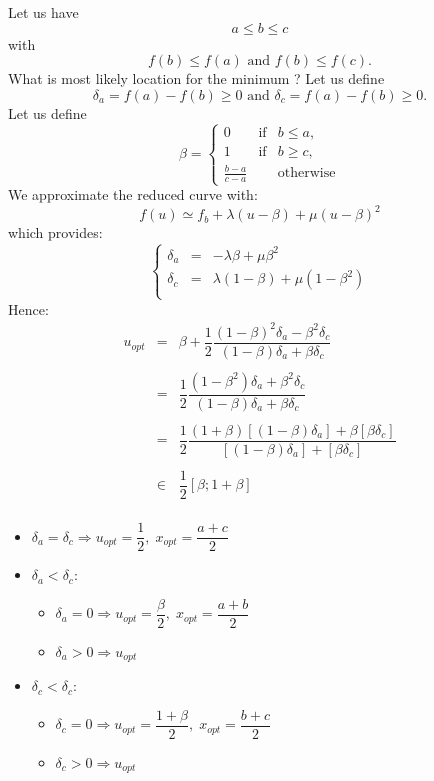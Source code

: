 \documentclass[aps,12pt]{revtex4}
\begin{document}

Let us have 
$$a \leq b \leq c$$ 
with 
$$f(b)\leq f(a) \text{ and } f(b)\leq f(c).$$
What is most likely location for the minimum ?
Let us define $$\delta_a = f(a)-f(b) \geq 0 \text{ and } \delta_c = f(a)-f(b)  \geq 0.$$ 
Let us define 
$$
	\beta = 
	\left\lbrace
	\begin{array}{rcl}
	0 & \text{if} & b\leq a,\\
	1 & \text{if} & b\geq c,\\
	\frac{b-a}{c-a} & & \text{otherwise}
	\end{array}
	\right.
$$
We approximate the reduced curve with:
$$
	f(u) \simeq f_b + \lambda (u-\beta)  + \mu (u-\beta)^2
$$
which provides:
$$
\left\lbrace
\begin{array}{rcl}
	\delta_a & = & -\lambda \beta + \mu \beta^2 \\
	\delta_c & = & \lambda(1-\beta) + \mu (1-\beta^2)\\
\end{array}
\right.
$$
Hence:
$$
\begin{array}{rcl}
	u_{opt} & = & \beta + \dfrac{1}{2} \dfrac{(1-\beta)^2 \delta_a - \beta^2 \delta_c }{(1-\beta)\delta_a + \beta \delta_c}\\
	\\
	 & = & \dfrac{1}{2} \dfrac{(1-\beta^2)\delta_a + \beta^2 \delta_c }{(1-\beta)\delta_a + \beta \delta_c}\\
	 \\
	 & = & \dfrac{1}{2} \dfrac{ (1+\beta)\left[(1-\beta)\delta_a\right] + \beta \left[\beta \delta_c\right] }{ \left[(1-\beta)\delta_a\right] + \left[\beta \delta_c\right] }\\
	 \\
	 & \in & \dfrac{1}{2} \left[ \beta; 1+\beta\right]\\ 
\end{array}
$$

\begin{itemize}
\item $\delta_a=\delta_c \Rightarrow u_{opt}=\dfrac{1}{2}, \; x_{opt}= \dfrac{a+c}{2}$
\item $\delta_a<\delta_c$:
	\begin{itemize}
	\item $\delta_a=0 \Rightarrow u_{opt} = \dfrac{\beta}{2}, \; x_{opt} = \dfrac{a+b}{2}$
	\item $\delta_a>0 \Rightarrow u_{opt}$
	\end{itemize}
\item $\delta_c<\delta_c$:
	\begin{itemize}
	\item $\delta_c=0 \Rightarrow u_{opt} = \dfrac{1+\beta}{2}, \;x_{opt} = \dfrac{b+c}{2}$
	\item $\delta_c>0 \Rightarrow u_{opt}$
	\end{itemize}
\end{itemize}
\end{document}

